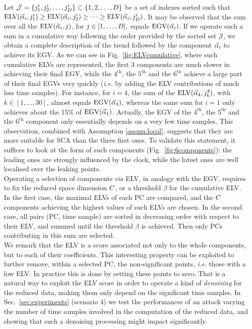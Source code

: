 Let $\mathcal{J}=\{j^i_1, j^i_2, \dots, j^i_{D}\}\subset\{1,2,\dots,D\}$ be a set of indexes sorted such that $\mathrm{ELV}(\vec{\alpha}_i,j^i_1)\geq \mathrm{ELV}(\vec{\alpha}_i,j^i_2)\geq \dots \geq \mathrm{ELV}(\vec{\alpha}_i,j^i_D)$.
It may be observed that the sum over all the $\mathrm{ELV}(\vec{\alpha}_i,j)$, for $j\in[1,\dots,D],$   equals $\mathrm{EGV}(\vec{\alpha}_i)$. If we operate such a sum in a cumulative way following the order provided by the sorted set $\mathcal{J}$, we obtain a complete description of the trend followed by the component $\vec{\alpha}_i$ to achieve its EGV. As we can see in Fig.~\ref{fig:ELVcumulative}, where such cumulative ELVs are represented, the first 3 components are much slower in achieving their final EGV, while the $4^\text{th}$, the $5^\text{th}$ and the $6^\text{th}$ achieve a large part of their final EGVs very quickly ({\em i.e.} by adding the ELV contributions of much less time samples). For instance, for $i=4$, the sum of the $\mathrm{ELV}(\vec{\alpha}_4, j^4_k)$, with $k\in[1,\dots,30]$, almost equals $\mathrm{EGV}(\vec{\alpha}_4)$, whereas the same sum for $i=1$ only achieves about the 15\% of $\mathrm{EGV}(\vec{\alpha}_1)$. Actually, the EGV of the $4^\text{th}$, the $5^\text{th}$ and the $6^\text{th}$ component only essentially depends on a very few time samples. This observation, combined with Assumption \ref{assum:local}, suggests that they are more suitable for SCA than the three first ones. To validate this statement, it suffices to look at the form of such components (Fig.~\ref{fig:6components}): the leading ones are strongly influenced by the clock, while the latest ones are well localised over the leaking points.\\

Operating a selection of components {\em via} ELV, in analogy with the EGV, requires to fix the reduced space dimension $C$, or a threshold $\beta$ for the cumulative ELV. In the first case, the maximal ELVs of each PC are compared, and the $C$ components achieving the highest values of such ELVs are chosen. In the second case, all pairs (PC, time sample) are sorted in decreasing order with respect to their ELV, and summed until the threshold $\beta$ is achieved. Then only PCs contributing in this sum are selected. \\

We remark that the ELV is a score associated not only to the whole components, but to each of their coefficients. This interesting property can be exploited to further remove, within a selected PC, the non-significant points, {\em i.e.} those with a low ELV. In practice this is done by setting these points to zero. That is a natural way to exploit the ELV score in order to operate a kind of {\em denoising} for the reduced data, making them only depend  on the significant time samples. In Sec.~\ref{sec:experiments} (scenario 4) we test the performances of an attack varying the number of time samples involved in the computation of the reduced data, and showing that such a denoising processing might impact significantly. 



